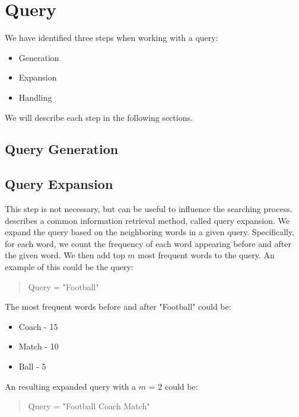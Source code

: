 \section{Query}
We have identified three steps when working with a query:
\begin{itemize}
	\item Generation
	\item Expansion
	\item Handling
\end{itemize}

We will describe each step in the following sections.

\subsection{Query Generation}


\subsection{Query Expansion}
This step is not necessary, but can be useful to influence the searching process. 
\citet{yang2009topic} describes a common information retrieval method, called query expansion.
We expand the query based on the neighboring words in a given query.
Specifically, for each word, we count the frequency of each word appearing before and after the given word.
We then add top $m$ most frequent words to the query.
An example of this could be the query: 
\begin{quote}
	Query = "Football"
\end{quote}
The most frequent words before and after "Football" could be:
\begin{itemize}
	\item Coach - 15
	\item Match - 10
	\item Ball - 5
\end{itemize}
An resulting expanded query with a $m$ = 2 could be:
\begin{quote}
	Query = "Football Coach Match"
\end{quote}



